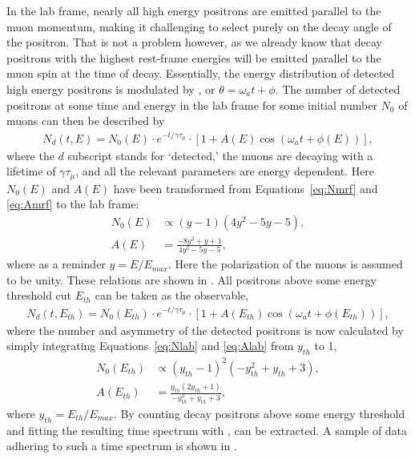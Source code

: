 In the lab frame, nearly all high energy positrons are emitted parallel to the muon momentum, making it challenging to select purely on the decay angle of the positron. That is not a problem however, as we already know that decay positrons with the highest rest-frame energies will be emitted parallel to the muon spin at the time of decay. Essentially, the energy distribution of detected high energy positrons is modulated by \wa, or $\theta = \omega_{a}t + \phi$. The number of detected positrons at some time and energy in the lab frame for some initial number $N_{0}$ of muons can then be described by
        \begin{align}
            N_{d}(t, E) = N_{0}(E) \cdot e^{-t/\gamma\tau_{\mu}} \cdot [1 + A(E) \cos(\omega_{a}t+\phi(E))],
        \end{align}
where the $d$ subscript stands for `detected,' the muons are decaying with a lifetime of $\gamma\tau_{\mu}$, and all the relevant parameters are energy dependent. Here $N_{0}(E)$ and $A(E)$ have been transformed from Equations~\ref{eq:Nmrf} and \ref{eq:Amrf} to the lab frame:
        \begin{align}
            N_{0}(E) &\propto (y-1)(4y^{2}-5y-5), \label{eq:Nlab} \\
            A(E) &= \frac{-8y^{2}+y+1}{4y^{2}-5y-5}, \label{eq:Alab}
        \end{align}
where as a reminder $y=E/E_{max}$. Here the polarization of the muons is assumed to be unity. These relations are shown in . All positrons above some energy threshold cut $E_{th}$ can be taken as the observable,
        \begin{align} \label{eq:5parfunc}
            N_{d}(t, E_{th}) = N_{0}(E_{th}) \cdot e^{-t/\gamma\tau_{\mu}} \cdot [1 + A(E_{th}) \cos(\omega_{a}t+\phi(E_{th}))],
        \end{align}
where the number and asymmetry of the detected positrons is now calculated by simply integrating Equations~\ref{eq:Nlab} and \ref{eq:Alab} from $y_{th}$ to 1,
        \begin{align}
            N_{0}(E_{th}) &\propto (y_{th}-1)^{2}(-y_{th}^{2}+y_{th}+3), \label{eq:Nth} \\
            A(E_{th}) &= \frac{y_{th}(2y_{th}+1)}{-y_{th}^{2}+y_{th}+3}, \label{eq:Ath}
        \end{align}
where $y_{th}=E_{th}/E_{max}$. By counting decay positrons above some energy threshold and fitting the resulting time spectrum with , \wa can be extracted. A sample of data adhering to such a time spectrum is shown in .


